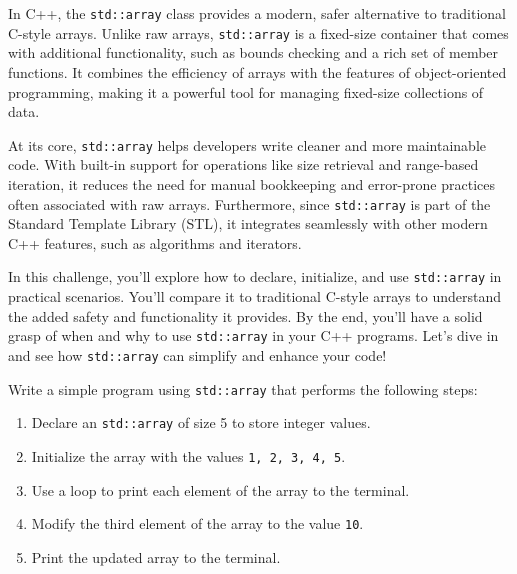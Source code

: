 \begin{challenge}
    \begin{chadescription}
    In C++, the \texttt{std::array} class provides a modern, safer alternative to traditional C-style arrays. 
    Unlike raw arrays, \texttt{std::array} is a fixed-size container that comes with additional functionality, such as bounds checking and a rich set of member functions.
    It combines the efficiency of arrays with the features of object-oriented programming, making it a powerful tool for managing fixed-size collections of data.

    At its core, \texttt{std::array} helps developers write cleaner and more maintainable code. 
    With built-in support for operations like size retrieval and range-based iteration, it reduces the need for manual bookkeeping and error-prone practices often associated with raw arrays.
    Furthermore, since \texttt{std::array} is part of the Standard Template Library (STL), it integrates seamlessly with other modern C++ features, such as algorithms and iterators.

    In this challenge, you'll explore how to declare, initialize, and use \texttt{std::array} in practical scenarios.
    You'll compare it to traditional C-style arrays to understand the added safety and functionality it provides.
    By the end, you’ll have a solid grasp of when and why to use \texttt{std::array} in your C++ programs.
    Let’s dive in and see how \texttt{std::array} can simplify and enhance your code!
    \end{chadescription}

    \begin{task}
        Write a simple program using \texttt{std::array} that performs the following steps:
        \begin{enumerate}
            \item Declare an \texttt{std::array} of size 5 to store integer values.
            \item Initialize the array with the values \texttt{1, 2, 3, 4, 5}.
            \item Use a loop to print each element of the array to the terminal.
            \item Modify the third element of the array to the value \texttt{10}.
            \item Print the updated array to the terminal.
        \end{enumerate}
        

\end{task}
\end{challenge}
